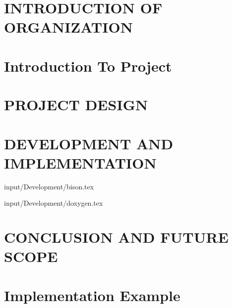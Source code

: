 \documentclass[12pt]{report}
\begin{document}

\begin{screen}
\ppttitle
\end{screen}
\footskip 0.7cm
\thispagestyle{empty} 
\pagetitle
\newpage
{}
\cfoot{\thepage}


\newpage


\newpage
\tableofcontents
\newpage
\listoffigures
\newpage
\listoftables
\newpage


\cfoot{\thepage}

\newpage
\chapter{INTRODUCTION OF ORGANIZATION}

\newpage


\chapter{Introduction To Project}







\chapter{PROJECT DESIGN}






\newpage
\chapter{DEVELOPMENT AND IMPLEMENTATION}


 {input/Development/bison.tex}


%
%
%

 {input/Development/doxygen.tex}




\chapter{CONCLUSION AND FUTURE SCOPE}






\appendix
\chapter{Implementation Example}

\end{document}
